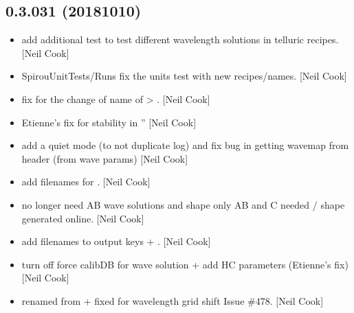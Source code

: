 \documentclass[a4paper,10pt,english]{report}
\begin{document}
\subsection{0.3.031 (2018\sphinxhyphen{}10\sphinxhyphen{}10)}
\label{\detokenize{misc/changelog:id318}}\begin{itemize}
\item {} 
 \sphinxhyphen{} add additional test to test different wavelength
solutions in telluric recipes. {[}Neil Cook{]}

\item {} 
SpirouUnitTests/Runs \sphinxhyphen{} fix the units test with new recipes/names.
{[}Neil Cook{]}

\item {} 
 \sphinxhyphen{} fix for the change of name of
 \textendash{}\textgreater{} . {[}Neil Cook{]}

\item {} 
 \sphinxhyphen{} Etienne’s fix for  stability in
” {[}Neil Cook{]}

\item {} 
 \sphinxhyphen{} add a quiet mode (to not duplicate log) and fix bug in
getting wavemap from header (from wave params) {[}Neil Cook{]}

\item {} 
 \sphinxhyphen{} add filenames for . {[}Neil Cook{]}

\item {} 
 \sphinxhyphen{} no longer need AB wave solutions and shape
\sphinxhyphen{} only AB and C needed / shape generated online. {[}Neil Cook{]}

\item {} 
 \sphinxhyphen{} add  filenames to output keys +
. {[}Neil Cook{]}

\item {} 
 \sphinxhyphen{} turn off force calibDB for wave solution +
add HC parameters (Etienne’s fix) {[}Neil Cook{]}

\item {} 
 \sphinxhyphen{} renamed from  + fixed for
wavelength grid shift \sphinxhyphen{} Issue \#478. {[}Neil Cook{]}


\end{itemize}
\end{document}
